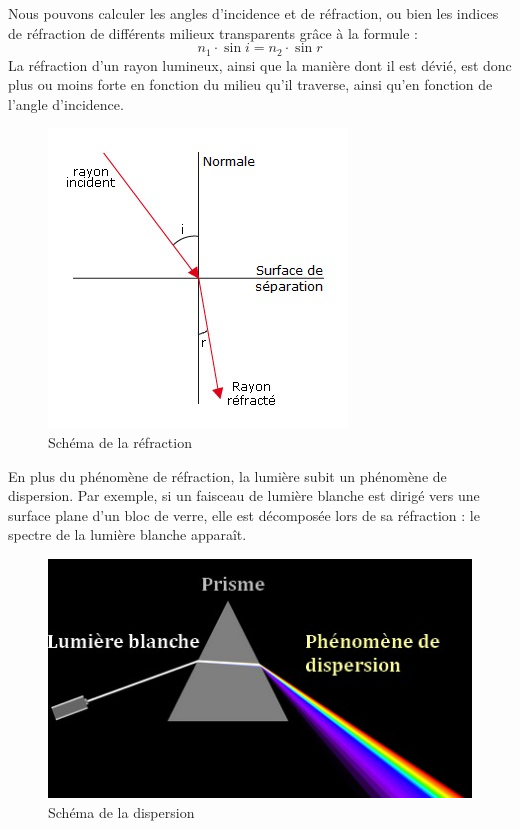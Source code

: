 \documentclass[a4paper, 12pt, onecolumn, openany]{report}
\begin{document}
	Nous pouvons calculer les angles d'incidence et de réfraction, ou bien les indices de réfraction de différents milieux transparents grâce à la formule :	
	\[
	n_{1} \cdot \sin i = n_{2} \cdot \sin r
	\]	
	La réfraction d’un rayon lumineux, ainsi que la manière dont il est dévié, est donc plus ou moins forte en fonction du milieu qu’il traverse, ainsi qu’en fonction de l’angle d’incidence.
	
	\begin{figure}[h]
	\begin{center}
	\includegraphics[scale=0.6]{refraction.jpg}	
	\end{center}	
	\caption{Schéma de la réfraction}
	\label{Schéma de la réfraction}	
	\end{figure}
	
	 En plus du phénomène de réfraction, la lumière subit un phénomène de dispersion. Par exemple, si un faisceau de lumière blanche est dirigé vers une surface plane d'un bloc de verre, elle est décomposée lors de sa réfraction : le spectre de la lumière blanche apparaît.
	 
	 \begin{figure}[h]
	 \begin{center}
	 \includegraphics[scale=0.73]{dispersion.jpg} 
	 \end{center}
	 \caption{Schéma de la dispersion}
	 \label{Schéma de la dispersion}
	 \end{figure}	 
	 
\end{document}
